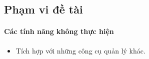 \subsection{Phạm vi đề tài}
\paragraph{Các tính năng không thực hiện}
\begin{itemize}
    \item Tích hợp với những công cụ quản lý khác.
\end{itemize}